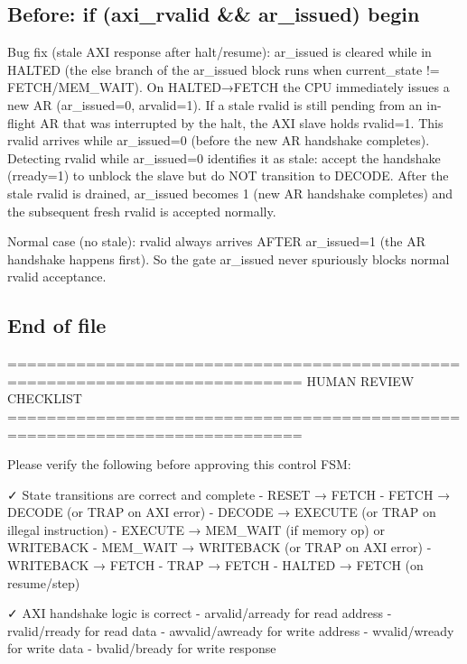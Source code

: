 \begin{record}

\subsection*{Before: if (axi\_rvalid \&\& ar\_issued) begin}

\begin{textblock}
Bug fix (stale AXI response after halt/resume):
ar_issued is cleared while in HALTED (the else branch of the
ar_issued block runs when current_state != FETCH/MEM_WAIT).
On HALTED→FETCH the CPU immediately issues a new AR (ar_issued=0,
arvalid=1).  If a stale rvalid is still pending from an in-flight AR
that was interrupted by the halt, the AXI slave holds rvalid=1.
This rvalid arrives while ar_issued=0 (before the new AR handshake
completes).  Detecting rvalid while ar_issued=0 identifies it as
stale: accept the handshake (rready=1) to unblock the slave but do
NOT transition to DECODE.  After the stale rvalid is drained,
ar_issued becomes 1 (new AR handshake completes) and the subsequent
fresh rvalid is accepted normally.

Normal case (no stale): rvalid always arrives AFTER ar_issued=1
(the AR handshake happens first).  So the gate ar_issued never
spuriously blocks normal rvalid acceptance.
\end{textblock}

\subsection*{End of file}

\begin{textblock}
============================================================================
HUMAN REVIEW CHECKLIST
============================================================================

Please verify the following before approving this control FSM:

✓ State transitions are correct and complete
  - RESET → FETCH
  - FETCH → DECODE (or TRAP on AXI error)
  - DECODE → EXECUTE (or TRAP on illegal instruction)
  - EXECUTE → MEM_WAIT (if memory op) or WRITEBACK
  - MEM_WAIT → WRITEBACK (or TRAP on AXI error)
  - WRITEBACK → FETCH
  - TRAP → FETCH
  - HALTED → FETCH (on resume/step)

✓ AXI handshake logic is correct
  - arvalid/arready for read address
  - rvalid/rready for read data
  - awvalid/awready for write address
  - wvalid/wready for write data
  - bvalid/bready for write response


\end{textblock}
\end{record}
